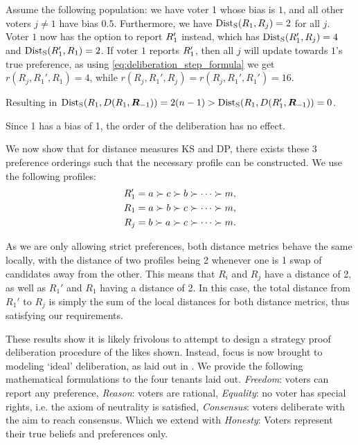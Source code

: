 \begin{proofc} Assume the following population: we
	have voter 1 whose bias is $1$, and all other voters $j \neq 1$
	have bias $0.5$. Furthermore, we have
	$\operatorname{Dist}_{\text{S}}(R_1, R_j) = 2$ for all
	$j$. Voter $1$ now has the option to report $R_{1}'$
	instead, which has $\operatorname{Dist}_{\text{S}}(R_{1}',
		R_j) = 4$ and $\operatorname{Dist}_{\text{S}}(R_{1}',
		R_1) = 2$. If voter $1$ reports $R_1'$,
	then all $j$ will update towards $1$'s true preference, as
	using \cref{eq:deliberation_step_formula} we get $r(R_{j},
		R_{1}', R_1) = 4$, while $r(R_{j}, R_{1}', R_j) = r(R_{j},
		R_{1}', R_1') = 16$.

	Resulting in $\operatorname{Dist}_{\text{S}}(R_{1},
		D(R_{1},\boldsymbol{R}_{-1})) = 2(n-1) >
		\operatorname{Dist}_{\text{S}}(R_{1}, D(R_{1}', \boldsymbol{R}_{-1})) =
		0$.

	Since 1 has a bias of 1, the order of the deliberation has no
	effect.

	We now show that for distance measures KS and DP, there exists
	these 3 preference orderings such that the necessary profile
	can be constructed. We use the following profiles: \[
		\begin{aligned} R_{1}' & = a \succ c \succ b \succ
                \cdots \succ m,                    \\ R_{1}  & = a \succ b \succ c
                \succ \cdots \succ m,              \\ R_{j}  & = b \succ a \succ c
                \succ \cdots \succ m.              \\\end{aligned} \]

	As we are only allowing strict preferences, both distance metrics
	behave the same locally, with the distance of two profiles being 2 whenever one
	is 1 swap of candidates away from the other. This means that  \(R_{i}\) and
	\(R_{j}\) have a distance of 2, as well as  \(R_{1}'\) and \(R_{1}\) having a
	distance of 2. In this case, the total distance from \(R_{1}'\) to \(R_{j}\) is
	simply the sum of the local distances for both distance metrics, thus
	satisfying our requirements.\hfill \end{proofc}


These results show it is likely frivolous to attempt to design a strategy proof
deliberation procedure of the likes shown. Instead, focus is now brought to
modeling `ideal' deliberation, as laid out in .
We provide the following mathematical formulations to the four tenants laid out.
\emph{Freedom}: voters can report any preference, \emph{Reason}: voters are
rational, \emph{Equality}: no voter has special rights, i.e. the axiom of
neutrality is satisfied, \emph{Consensus}: voters deliberate with the aim to
reach consensus. Which we extend with \emph{Honesty}: Voters represent their
true beliefs and preferences only.


